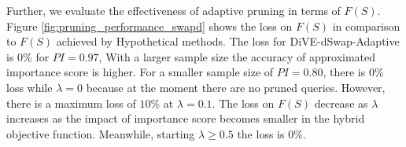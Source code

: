 Further, we evaluate the effectiveness of adaptive pruning in terms of $F\left(S\right)$. 
Figure \ref{fig:pruning_performance_swapd} shows the loss on $F\left(S\right)$ in comparison to $F\left(S\right)$ achieved by Hypothetical methods. The loss for DiVE-dSwap-Adaptive is $0\%$ for $PI=0.97$, With a larger sample size the accuracy of approximated importance score is higher. For a smaller sample size of $PI=0.80$, there is 0\% loss while $\lambda = 0$ because at the moment there are no pruned queries. However, there is a maximum loss of $10\%$ at $\lambda= 0.1$. The loss on $F\left(S\right)$ decrease as $\lambda$ increases as the impact of importance score becomes smaller in the hybrid objective function. Meanwhile, starting $\lambda \geq 0.5$ the loss is 0\%.

























